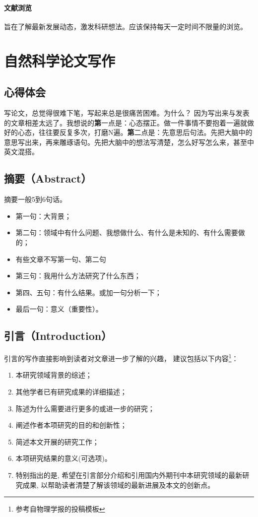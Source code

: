 \paragraph{文献浏览}旨在了解最新发展动态，激发科研想法。应该保持每天一定时间不限量的浏览。





\section{自然科学论文写作}
\subsection{心得体会}
写论文，总觉得很难下笔，写起来总是很痛苦困难。为什么？
因为写出来与发表的文章相差太远了。我想说的{\textbf 第一点}是：心态摆正。做一件事情不要抱着一遍就做好的心态，往往要反复多次，打磨N遍。{\textbf 第二点}是：先意思后句法。先把大脑中的意思写出来，再来雕琢语句。先把大脑中的想法写清楚，怎么好写怎么来，甚至中英文混搭。


\subsection{摘要（Abstract）}
摘要一般5到6句话。
\begin{itemize}
\item 第一句：大背景；
\item 第二句：领域中有什么问题、我想做什么、有什么是未知的、有什么需要做的；
\item 有些文章不写第一句、第二句
\item 第三句：我用什么方法研究了什么东西；
\item 第四、五句：有什么结果。或加一句分析一下；
\item 最后一句：意义（重要性）。
\end{itemize}


\subsection{引言（Introduction）}
引言的写作直接影响到读者对文章进一步了解的兴趣， 建议包括以下内容\footnote{参考自物理学报的投稿模板}：
\begin{enumerate}
\item 本研究领域背景的综述；
\item 其他学者已有研究成果的详细描述；
\item 陈述为什么需要进行更多的或进一步的研究；
\item 阐述作者本项研究的目的和创新性；
\item 简述本文开展的研究工作；
\item 本项研究结果的意义(可选项)。
\item 特别指出的是, 希望在引言部分介绍和引用国内外期刊中本研究领域的最新研究成果, 以帮助读者清楚了解该领域的最新进展及本文的创新点。
\end{enumerate}





